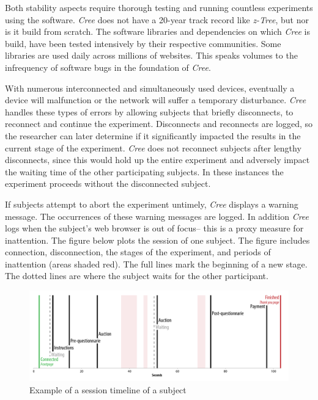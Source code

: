 \documentclass[preprint, 12pt]{elsarticle}
\newcommand{\Cree}{\emph{Cree}\xspace}
\begin{document}
Both stability aspects require thorough testing and running countless experiments using the software. \Cree does not have a 20-year track record like \emph{z-Tree}, but nor is it build from scratch. The software libraries and dependencies on which \Cree is build, have been tested intensively by their respective communities. Some libraries are used daily across millions of websites\footnotemark[6]. This speaks volumes to the infrequency of software bugs in the foundation of \Cree.


With numerous interconnected and simultaneously used devices, eventually a device will malfunction or the network will suffer a temporary disturbance. \Cree handles these types of errors by allowing subjects that briefly disconnects, to reconnect and continue the experiment. Disconnects and reconnects are logged, so the researcher can later determine if it significantly impacted the results in the current stage of the experiment. \Cree does not reconnect subjects after lengthy disconnects, since this would hold up the entire experiment and adversely impact the waiting time of the other participating subjects. In these instances the experiment proceeds without the disconnected subject.

If subjects attempt to abort the experiment untimely, \Cree displays a warning message. The occurrences of these warning messages are logged. In addition \Cree logs when the subject's web browser is out of focus\footnotemark[7] -- this is a proxy measure for inattention. The figure below plots the session of one subject. The figure includes connection, disconnection, the stages of the experiment, and periods of inattention (areas shaded red). The full lines mark the beginning of a new stage. The dotted lines are where the subject waits for the other participant.

\begin{figure}[h!]
  \caption{Example of a session timeline of a subject}
  \centering
    \includegraphics[width=\textwidth]{figures/example_session}
\end{figure}
\end{document}

